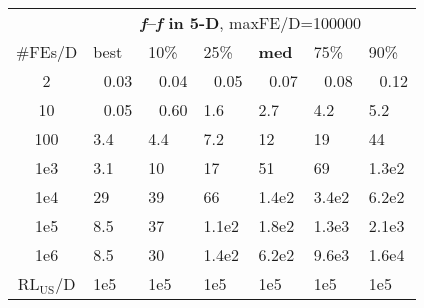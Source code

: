 \begin{tabular}{c|llllll}
 & \multicolumn{6}{|c}{\textbf{\textit{f}\raisebox{-0.35ex}{1}--\textit{f}\raisebox{-0.35ex}{24} in 5-D}, maxFE/D=100000}\\
\#FEs/D & best & 10\% & 25\% & \textbf{med} & 75\% & 90\%\\
2 & ~\,0.03 & ~\,0.04 & ~\,0.05 & ~\,0.07 & ~\,0.08 & ~\,0.12\\
10 & ~\,0.05 & ~\,0.60 & \hspace*{1ex}1.6 & \hspace*{1ex}2.7 & \hspace*{1ex}4.2 & \hspace*{1ex}5.2\\
100 & \hspace*{1ex}3.4 & \hspace*{1ex}4.4 & \hspace*{1ex}7.2 & 12 & 19 & 44\\
1e3 & \hspace*{1ex}3.1 & 10 & 17 & 51 & 69 & 1.3e2\\
1e4 & 29 & 39 & 66 & 1.4e2 & 3.4e2 & 6.2e2\\
1e5 & \hspace*{1ex}8.5 & 37 & 1.1e2 & 1.8e2 & 1.3e3 & 2.1e3\\
1e6 & \hspace*{1ex}8.5 & 30 & 1.4e2 & 6.2e2 & 9.6e3 & 1.6e4\\
$\text{RL}_{\text{US}}$/D & 1e5 & 1e5 & 1e5 & 1e5 & 1e5 & 1e5
\end{tabular}
